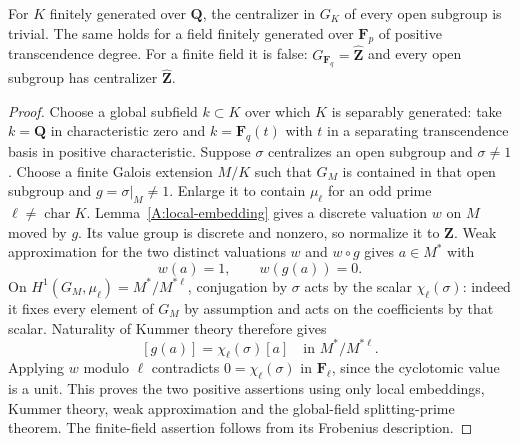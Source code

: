 \begin{proposition}
\label{A:slim}
For $K$ finitely generated over $\mathbf Q$, the
centralizer in $G_K$ of every open subgroup is trivial.
The same holds for a field finitely generated over
$\mathbf F_p$ of positive transcendence degree.  For a
finite field it is false: $G_{\mathbf F_q}=\widehat{
\mathbf Z}$ and every open subgroup has centralizer
$\widehat{\mathbf Z}$.
\end{proposition}
\begin{proof}
Choose a global subfield $k\subset K$ over which $K$
is separably generated: take $k=\mathbf Q$ in
characteristic zero and $k=\mathbf F_q(t)$ with $t$
in a separating transcendence basis in positive
characteristic.  Suppose $\sigma$ centralizes an open
subgroup and $\sigma\ne1$.  Choose a finite Galois
extension $M/K$ such that $G_M$ is contained in that
open subgroup and $g=\sigma|_M\ne1$.  Enlarge it to
contain $\mu_\ell$ for an odd prime $\ell\ne
\operatorname{char}K$.  Lemma~\ref{A:local-embedding}
gives a discrete valuation $w$ on $M$ moved by $g$.
Its value group is discrete and nonzero, so normalize
it to $\mathbf Z$.  Weak approximation for the two
distinct valuations $w$ and $w\circ g$ gives $a\in M^*$
with
\[
             w(a)=1,\qquad w(g(a))=0.
\]
On $H^1(G_M,\mu_\ell)=M^*/M^{*\ell}$, conjugation
by $\sigma$ acts by the scalar $\chi_\ell(\sigma)$:
indeed it fixes every element of $G_M$ by assumption
and acts on the coefficients by that scalar.  Naturality
of Kummer theory therefore gives
\[
       [g(a)]=\chi_\ell(\sigma)[a]
                   \quad\text{in }M^*/M^{*\ell}.
\]
Applying $w$ modulo $\ell$ contradicts $0=
\chi_\ell(\sigma)$ in $\mathbf F_\ell$, since the
cyclotomic value is a unit.  This proves the two
positive assertions using only local embeddings,
Kummer theory, weak approximation and the global-field
splitting-prime theorem.  The finite-field assertion
follows from its Frobenius description.
\end{proof}


